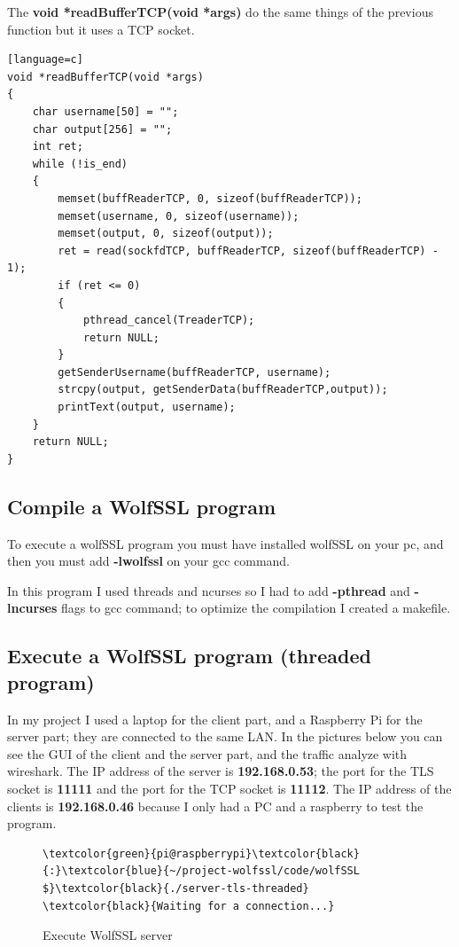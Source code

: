 \documentclass[a4paper,12pt]{article}
\begin{document}
The \textbf{void *readBufferTCP(void *args)} do the same things of the previous function but it uses a TCP socket.
\begin{lstlisting}[caption={void *readBufferTCP(void *args) of TLS client},captionpos=b][language=c]
void *readBufferTCP(void *args)
{
    char username[50] = "";
    char output[256] = "";
    int ret;
    while (!is_end)
    {
        memset(buffReaderTCP, 0, sizeof(buffReaderTCP));
        memset(username, 0, sizeof(username));
        memset(output, 0, sizeof(output));
        ret = read(sockfdTCP, buffReaderTCP, sizeof(buffReaderTCP) - 1);
        if (ret <= 0)
        {
            pthread_cancel(TreaderTCP);
            return NULL;
        }
        getSenderUsername(buffReaderTCP, username);
        strcpy(output, getSenderData(buffReaderTCP,output));
        printText(output, username);
    }
    return NULL;
}
\end{lstlisting}

\subsection{Compile a WolfSSL program}
To execute a wolfSSL program you must have installed wolfSSL on your pc, and then you must add \textbf{-lwolfssl} on your gcc command.

In this program I used threads and ncurses so I had to add \textbf{-pthread} and \textbf{-lncurses} flags to gcc command; to optimize the compilation I created a makefile.

\subsection{Execute a WolfSSL program (threaded program)}
In my project I used a laptop for the client part, and a Raspberry Pi for the server part; they are connected to the same LAN.
In the pictures below you can see the GUI of the client and the server part, and the traffic analyze with wireshark.
The IP address of the server is \textbf{192.168.0.53}; the port for the TLS socket is \textbf{11111} and the port for the TCP socket is \textbf{11112}.
The IP address of the clients is \textbf{192.168.0.46} because I only had a PC and a raspberry to test the program.

\begin{figure}[H]
\begin{Verbatim}[commandchars=\\\{\}]
\textcolor{green}{pi@raspberrypi}\textcolor{black}{:}\textcolor{blue}{~/project-wolfssl/code/wolfSSL $}\textcolor{black}{./server-tls-threaded}
\textcolor{black}{Waiting for a connection...}
\end{Verbatim}
\caption{Execute WolfSSL server}
\end{figure}
\end{document}
